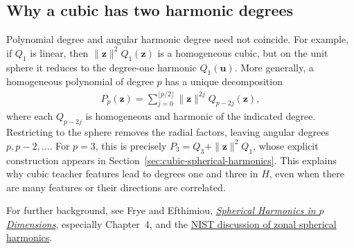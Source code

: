 \documentclass[11pt, reqno]{amsart}
\theoremstyle{notestyle}
\theoremstyle{defstyle}
\begin{document}
\subsection{Why a cubic has two harmonic degrees}
Polynomial degree and angular harmonic degree need not coincide.
For example, if $Q_1$ is linear, then $\|\mathbf z\|^2Q_1(\mathbf z)$ is a homogeneous cubic, but on the unit sphere it reduces to the degree-one harmonic $Q_1(\mathbf u)$.
More generally, a homogeneous polynomial of degree $p$ has a unique decomposition
\begin{align*}
    P_p(\mathbf z)
    =\sum_{j=0}^{\lfloor p/2\rfloor}\|\mathbf z\|^{2j}Q_{p-2j}(\mathbf z),
\end{align*}
where each $Q_{p-2j}$ is homogeneous and harmonic of the indicated degree.
Restricting to the sphere removes the radial factors, leaving angular degrees $p,p-2,\ldots$.
For $p=3$, this is precisely $P_3=Q_3+\|\mathbf z\|^2Q_1$, whose explicit construction appears in Section~\ref{sec:cubic-spherical-harmonics}.
This explains why cubic teacher features lead to degrees one and three in $H$, even when there are many features or their directions are correlated.

For further background, see Frye and Efthimiou, \href{https://arxiv.org/abs/1205.3548}{\textit{Spherical Harmonics in $p$ Dimensions}}, especially Chapter~4, and the \href{https://dlmf.nist.gov/18.38}{NIST discussion of zonal spherical harmonics}.
\end{document}
